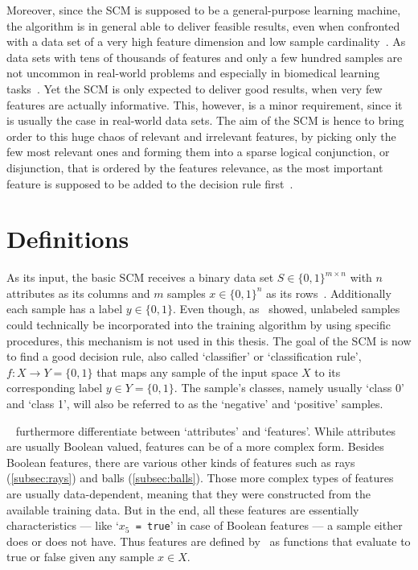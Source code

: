 Moreover, since the SCM is supposed to be a general-purpose learning machine,
the algorithm is in general able to deliver feasible results, even when confronted with a data set of a
very high feature dimension and low sample cardinality~\citep{kestler11}.
As data sets with tens of thousands of features and only a few hundred samples are not uncommon
in real-world problems and especially in biomedical learning tasks~\citep{lausser20}.
Yet the SCM is only expected to deliver good results, when very few features are actually informative.
This, however, is a minor requirement, since it is usually the case in real-world data sets.
The aim of the SCM is hence to bring order to this huge chaos of relevant and irrelevant features,
by picking only the few most relevant ones and forming them into a sparse logical conjunction, or disjunction, that is ordered by the features relevance,
as the most important feature is supposed to be added to the decision rule first~\citep{marchand02}.

\section{Definitions}\label{sec:definitions}

As its input, the basic SCM receives a binary data set \(S \in \lbrace0,1\rbrace^{m \times n}\) with
\(n\) attributes as its columns and \(m\) samples \(x \in \lbrace0,1\rbrace^{n}\) as its rows~\citep{marchand02}.
Additionally each sample has a label \(y \in \lbrace0,1\rbrace\).
Even though, as~\cite{schmid} showed, unlabeled samples could technically be incorporated into the training algorithm by using specific procedures,
this mechanism is not used in this thesis.
The goal of the SCM is now to find a good decision rule, also called `classifier' or `classification rule',
\(f: X \rightarrow Y = \lbrace0,1\rbrace\) that maps any sample of the input space \(X\) to its corresponding label \(y \in Y = \lbrace0,1\rbrace\).
The sample's classes, namely usually `class 0' and `class 1', will also be referred to as the `negative' and `positive' samples.

~\cite{marchand02} furthermore differentiate between `attributes' and `features'.
While attributes are usually Boolean valued, features can be of a more complex form.
Besides Boolean features, there are various other kinds of features such as rays (\autoref{subsec:rays}) and balls (\autoref{subsec:balls}).
Those more complex types of features are usually data-dependent, meaning that they were constructed from the available training data.
But in the end, all these features are essentially characteristics --- like `\texttt{\(x_5\) = true}' in case of Boolean features --- a sample either does or does not have.
Thus features are defined by~\cite{marchand02} as functions that evaluate to true or false given any sample \(x \in X\).


